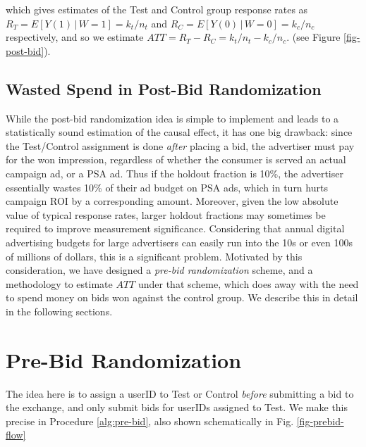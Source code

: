 \documentclass[11pt,a4paper]{article}
\theoremstyle{definition}
\theoremstyle{remark}
\theoremstyle{definition}
\theoremstyle{definition}
\theoremstyle{definition}
\theoremstyle{definition}
\theoremstyle{definition}
\theoremstyle{definition}
\begin{document}
which gives estimates of the Test and Control group response rates as $R_T = E[Y(1)\,|\,W=1] = k_t/n_t$ and $R_C = E[Y(0)\,|\,W=0] = k_c/n_c$ respectively, and so we estimate $ATT = R_T - R_C =  k_t/n_t - k_c/n_c$. 
(see Figure \ref{fig-post-bid}).


\subsection{Wasted Spend in Post-Bid Randomization}
While the post-bid randomization idea is simple to implement and leads to a statistically sound estimation of the causal effect, it has one big drawback: 
since the Test/Control assignment is done {\em after} placing a bid, the advertiser must pay for the won impression, regardless of whether the consumer is served an actual campaign ad, or a PSA ad. 
Thus if the holdout fraction is 10\%, the advertiser essentially wastes 10\% of their ad budget on PSA ads, which in turn hurts campaign ROI by a corresponding amount. 
Moreover, given the low absolute value of typical response rates, larger holdout fractions may sometimes be required to improve measurement significance. 
Considering that annual digital advertising budgets for large advertisers can easily run into the 10s or even 100s of millions of dollars, this is a significant problem. 
Motivated by this consideration, we have designed a {\em pre-bid randomization} scheme, and a methodology to estimate $ATT$ under that scheme, which does away with the need to spend money on bids won against the control group. We describe this in detail in the following sections.


\section{Pre-Bid Randomization} \label{sec-prebid}

The idea here is to assign a userID to Test or Control {\em before} submitting a bid to the exchange, and only submit bids for userIDs assigned to Test. We make this precise in Procedure \ref{alg:pre-bid}, also shown schematically in Fig. \ref{fig-prebid-flow}
\end{document}
